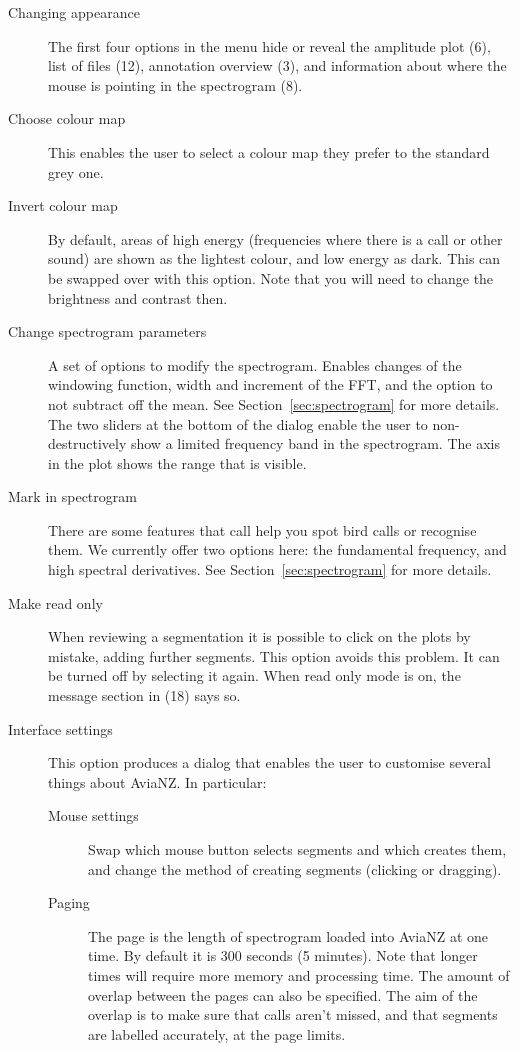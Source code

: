 \documentclass{article}
\begin{document}
\begin{description}
\item [Changing appearance] The first four options in the menu hide or reveal the amplitude plot (6), list of files (12), annotation overview (3), and information about where the mouse is pointing in the spectrogram (8). 
\item [Choose colour map] This enables the user to select a colour map they prefer to the standard grey one. 
\item [Invert colour map] By default, areas of high energy (frequencies where there is a call or other sound) are shown as the lightest colour, and low energy as dark. This can be swapped over with this option. Note that you will need to change the brightness and contrast then. 
\item [Change spectrogram parameters] A set of options to modify the spectrogram. Enables changes of the windowing function, width and increment of the FFT, and the option to not subtract off the mean. See Section~\ref{sec:spectrogram} for more details. %
The two sliders at the bottom of the dialog enable the user to non-destructively show a limited frequency band in the spectrogram. The axis in the plot shows the range that is visible. 
\item [Mark in spectrogram] There are some features that call help you spot bird calls or recognise them. We currently offer two options here: the fundamental frequency, and high spectral derivatives. See Section~\ref{sec:spectrogram} for more details.
\item [Make read only] When reviewing a segmentation it is possible to click on the plots by mistake, adding further segments. This option avoids this problem. It can be turned off by selecting it again. When read only mode is on, the message section in (18) says so. 
\item [Interface settings] This option produces a dialog that enables the user to customise several things about AviaNZ. In particular:
\begin{description}
\item[Mouse settings] Swap which mouse button selects segments and which creates them, and change the method of creating segments (clicking or dragging).
\item[Paging] The page is the length of spectrogram loaded into AviaNZ at one time. By default it is 300 seconds (5 minutes). Note that longer times will require more memory and processing time. The amount of overlap between the pages can also be specified. The aim of the overlap is to make sure that calls aren't missed, and that segments are labelled accurately, at the page limits. 

\end{description}
\end{description}
\end{document}
